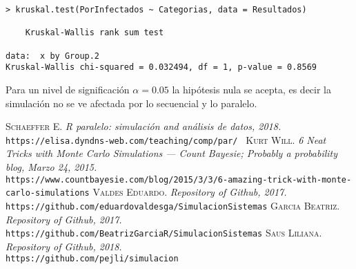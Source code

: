 \documentclass[10pt,a4paper]{article}
\begin{document}
\begin{lstlisting}
> kruskal.test(PorInfectados ~ Categorias, data = Resultados)

    Kruskal-Wallis rank sum test

data:  x by Group.2
Kruskal-Wallis chi-squared = 0.032494, df = 1, p-value = 0.8569
\end{lstlisting}

Para un nivel de significación $\alpha = 0.05$ la hipótesis nula se acepta, es decir la simulación no se ve afectada por lo secuencial y lo paralelo.

\begin{thebibliography}{X}
 \textsc{Schaeffer E.} \textit{R paralelo: simulación and análisis de datos, 2018.} \\
\texttt{https://elisa.dyndns-web.com/teaching/comp/par/ }
 \textsc{Kurt Will.} \textit{6 Neat Tricks with Monte Carlo Simulations — Count Bayesie; Probably a probability blog, Marzo 24, 2015.} \\
\texttt{https://www.countbayesie.com/blog/2015/3/3/6-amazing-trick-with-monte-carlo-simulations}
 \textsc{Valdes Eduardo.} \textit{Repository of Github, 2017.} \\
\texttt{https://github.com/eduardovaldesga/SimulacionSistemas}
 \textsc{Garcia Beatriz.} \textit{Repository of Github, 2017.} \\
\texttt{https://github.com/BeatrizGarciaR/SimulacionSistemas}
 \textsc{Saus Liliana.} \textit{Repository of Github, 2018.} \\
\texttt{https://github.com/pejli/simulacion}
\end{thebibliography}
\end{document}
